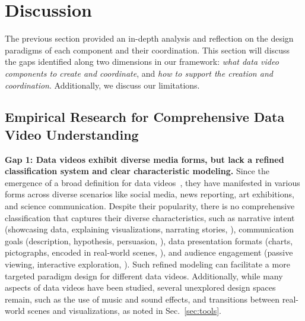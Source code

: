 
\section{Discussion}
The previous section provided an in-depth analysis and reflection on the design paradigms of each component and their coordination. 
This section will discuss the gaps identified along two dimensions in our framework: \textit{what data video components to create and coordinate}, and \textit{how to support the creation and coordination}.
Additionally, we discuss our limitations. 

\subsection{Empirical Research for Comprehensive Data Video Understanding}

\textbf{Gap 1: Data videos exhibit diverse media forms, but lack a refined classification system and clear characteristic modeling.}
Since the emergence of a broad definition for data videos~\cite{Segel2010, Amini2015}, they have manifested in various forms across diverse scenarios like social media, news reporting, art exhibitions, and science communication. 
Despite their popularity, there is no comprehensive classification that captures their diverse characteristics, such as narrative intent (\eg showcasing data, explaining visualizations, narrating stories, \etc), communication goals (\eg description, hypothesis, persuasion, \etc), data presentation formats (\eg charts, pictographs, encoded in real-world scenes, \etc), and audience engagement (\eg passive viewing, interactive exploration, \etc). 
Such refined modeling can facilitate a more targeted paradigm design for different data videos.
Additionally, while many aspects of data videos have been studied, several unexplored design spaces remain, such as the use of music and sound effects, and transitions between real-world scenes and visualizations, as noted in Sec.~\ref{sec:tools}. 

